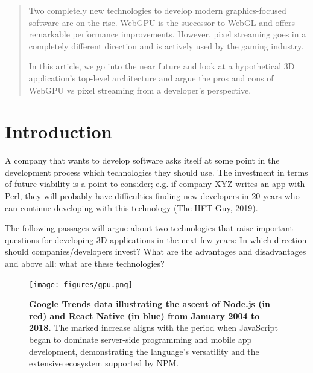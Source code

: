 \documentclass[10pt]{article}
\begin{document}
\begin{sloppypar}
  \begin{abstract}
    Two completely new technologies to develop modern graphics-focused software are on the rise. WebGPU is the successor to WebGL and offers remarkable performance improvements. However, pixel streaming goes in a completely different direction and is actively used by the gaming industry.

    In this article, we go into the near future and look at a hypothetical 3D application’s top-level architecture and argue the pros and cons of WebGPU vs pixel streaming from a developer’s perspective.
  \end{abstract}

  \pagebreak
  \tableofcontents
  \pagebreak
  \listoffigures
  \pagebreak
  \listoftables
  \pagebreak
  \lstlistoflistings
  \pagebreak


  \section{Introduction}
  \label{sec:introduction}

  A company that wants to develop software asks itself at some point in the development process which technologies they should use. The investment in terms of future viability is a point to consider; e.g. if company XYZ writes an app with Perl, they will probably have difficulties finding new developers in 20 years who can continue developing with this technology (The HFT Guy, 2019).

  The following passages will argue about two technologies that raise important questions for developing 3D applications in the next few years: In which direction should companies/developers invest? What are the advantages and disadvantages and above all: what are these technologies?

  \begin{figure}[ht]
    \centering
    \texttt{[image: figures/gpu.png]}
    \caption[Google Trends data illustrating the ascent of Node.js and React Native.]{\textbf{Google Trends data illustrating the ascent of Node.js (in red) and React Native (in blue) from January 2004 to 2018.} The marked increase aligns with the period when JavaScript began to dominate server-side programming and mobile app development, demonstrating the language's versatility and the extensive ecosystem supported by NPM.}
    \label{fig:gpu}
  \end{figure}


\end{sloppypar}
\end{document}
